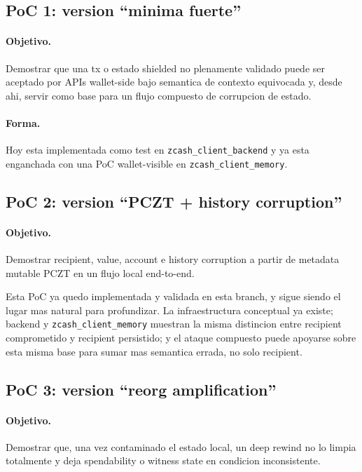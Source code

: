 \documentclass[11pt,a4paper]{article}
\begin{document}
\subsection{PoC 1: version ``minima fuerte''}

\paragraph{Objetivo.}
Demostrar que una tx o estado shielded no plenamente validado puede ser
aceptado por APIs wallet-side bajo semantica de contexto equivocada y, desde
ahi, servir como base para un flujo compuesto de corrupcion de estado.

\paragraph{Forma.}
Hoy esta implementada como test en \texttt{zcash\_client\_backend} y ya esta
enganchada con una PoC wallet-visible en
\texttt{zcash\_client\_memory}.

\subsection{PoC 2: version ``PCZT + history corruption''}

\paragraph{Objetivo.}
Demostrar recipient, value, account e history corruption a partir de metadata
mutable PCZT en un flujo local end-to-end.

Esta PoC ya quedo implementada y validada en esta branch, y sigue siendo el
lugar mas natural para profundizar. La infraestructura conceptual ya existe;
backend y \texttt{zcash\_client\_memory} muestran la misma distincion entre
recipient comprometido y recipient persistido; y el ataque compuesto puede
apoyarse sobre esta misma base para sumar mas semantica errada, no solo
recipient.

\subsection{PoC 3: version ``reorg amplification''}

\paragraph{Objetivo.}
Demostrar que, una vez contaminado el estado local, un deep rewind no lo limpia
totalmente y deja spendability o witness state en condicion inconsistente.
\end{document}
